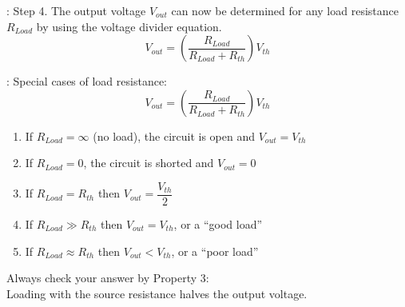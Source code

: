\documentclass[handout]{beamer}
\begin{document}
\begin{frame}{\secname : \subsecname}
    Step 4.  The output voltage $V_{out}$ can now be determined for any load resistance $R_{Load}$ by using the voltage divider equation.
    \begin{equation}
        V_{out}=\left( \dfrac{R_{Load}}{R_{Load}+R_{th}} \right) V_{th}
    \end{equation}
    \begin{figure}
    \end{figure}
\end{frame}
\begin{frame}{\secname : \subsecname}
    Special cases of load resistance:
    \begin{equation}
        V_{out}=\left( \dfrac{R_{Load}}{R_{Load}+R_{th}} \right) V_{th}
    \end{equation}
    \begin{enumerate}
        \item If $R_{Load} = \infty$ (no load), the circuit is open and $V_{out}=V_{th}$
        \item If $R_{Load} = 0$, the circuit is shorted and $V_{out}=0$
        \item If $R_{Load} = R_{th}$ then $V_{out}=\dfrac{V_{th}}{2}$
        \item If $R_{Load} \gg R_{th}$ then $V_{out}=V_{th}$, or a ``good load''
        \item If $R_{Load} \approx R_{th}$ then $V_{out}<V_{th}$, or a ``poor load''
    \end{enumerate}
    \vspace{0.5 cm}
    Always check your answer by Property 3:  \\
    Loading with the source resistance halves the output voltage.
\end{frame}
\end{document}
